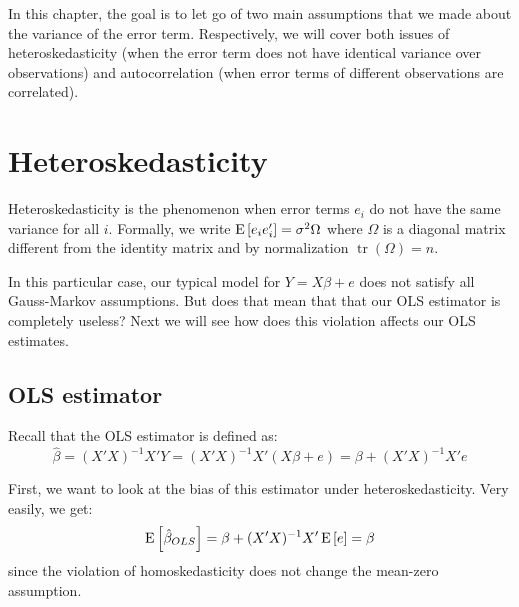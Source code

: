 In this chapter, the goal is to let go of two main assumptions that we made about the variance of the error term. Respectively, we will cover both issues of heteroskedasticity (when the error term does not have identical variance over observations) and autocorrelation (when error terms of different observations are correlated).

\section{Heteroskedasticity}

Heteroskedasticity is the phenomenon when error terms $e_i$ do not have the same variance for all $i$. Formally, we write $\operatorname{E}\left[e_ie_i'\right] = \sigma^2\Omega$ where $\Omega$ is a diagonal matrix different from the identity matrix and by normalization $\operatorname{tr}(\Omega) = n$.

In this particular case, our typical model for $Y = X\beta +e$ does not satisfy all Gauss-Markov assumptions. But does that mean that that our OLS estimator is completely useless? Next we will see how does this violation affects our OLS estimates.

\subsection{OLS estimator}

Recall that the OLS estimator is defined as: $$\hat\beta = (X'X)^{-1}X'Y = (X'X)^{-1}X'(X\beta + e) = \beta + (X'X)^{-1}X'e $$

First, we want to look at the bias of this estimator under heteroskedasticity. Very easily, we get: $$\operatorname{E}\left[\hat\beta_{OLS}\right] = \beta + (X'X)^{-1}X'\operatorname{E}\left[e\right] = \beta $$ since the violation of homoskedasticity does not change the mean-zero assumption.

